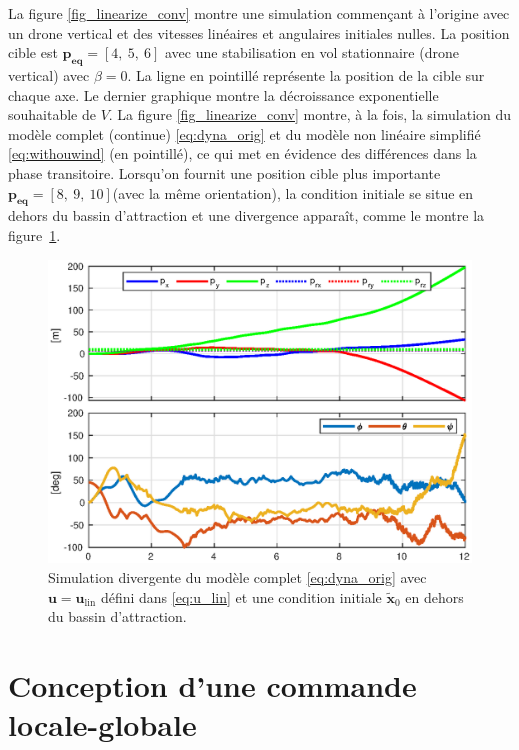 La figure \ref{fig_linearize_conv} montre une simulation commençant à l'origine avec un drone vertical et des vitesses linéaires et angulaires initiales nulles. La position cible est $\boldsymbol{p_{\text{eq}}} = [4,~5,~6]$ avec une stabilisation en vol stationnaire (drone vertical) avec $\beta = 0$. La ligne en pointillé représente la position de la cible sur chaque axe. Le dernier graphique montre la décroissance exponentielle souhaitable de $V$.
La figure \ref{fig_linearize_conv} montre, à la fois, la simulation du modèle complet (continue) \eqref{eq:dyna_orig} et du modèle non linéaire simplifié \eqref{eq:withouwind} (en pointillé), ce qui met en évidence des différences dans la phase transitoire.
Lorsqu'on fournit une position cible plus importante $\boldsymbol{p_{\text{eq}}} =[8,~9,~10]$(avec la même orientation), la condition initiale se situe en dehors du bassin d'attraction et une divergence apparaît, comme le montre la figure~\ref{fig_linearize_div}.

\begin{figure}[ht!]
    \centering
    \includegraphics[trim=0cm 0cm 0cm 0cm,clip,width=0.8\columnwidth]{figures/diverge2.eps}
    \caption{Simulation divergente du modèle complet \eqref{eq:dyna_orig} avec $\boldsymbol{u} = \boldsymbol{u}_{\text{lin}}$ défini dans 
    \eqref{eq:u_lin} et une condition initiale $\tilde{ \boldsymbol{x}}_0$ en dehors du bassin d'attraction.}
    \label{fig_linearize_div}
\end{figure}



\section{Conception d'une commande locale-globale}
\label{sec:ctrl_hyste}
 
